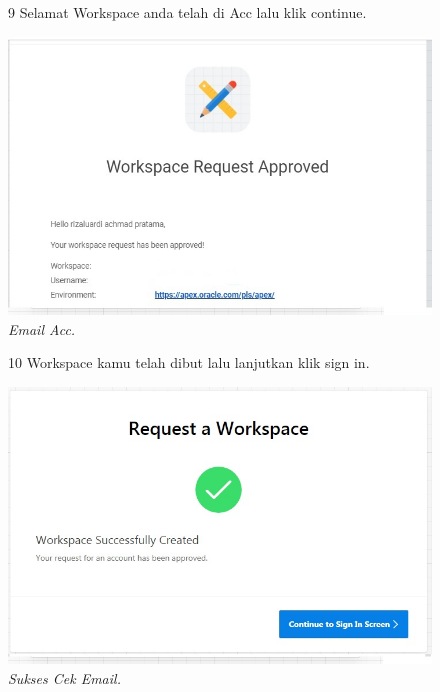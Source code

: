 \begin{enumerate}
\begin{figure}
\item[9] Selamat Workspace anda telah di Acc lalu klik continue.

    \begin{center}
\includegraphics[scale=0.5]{figures/req7.jpg}
    \caption{\textit{Email Acc.}}
        \end{center}
\label{gambar}
\end{figure}

\begin{figure}
\item[10] Workspace kamu telah dibut lalu lanjutkan klik sign in.

    \begin{center}
\includegraphics[scale=0.5]{figures/req8.jpg}
    \caption{\textit{Sukses Cek Email.}}
        \end{center}
\label{gambar}
\end{figure}


\end{enumerate}
